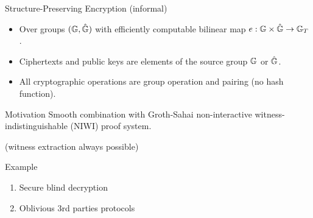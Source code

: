\begin{frame}
  \begin{block}{Structure-Preserving Encryption (informal)}
    \pause
    \begin{itemize}
    \item Over groups $(\mathbb{G}, \hat{\mathbb{G}})$ with efficiently computable bilinear map $e: \mathbb{G} \times \hat{\mathbb{G}} \to \mathbb{G}_T$.
      \pause
    \item Ciphertexts and public keys are elements of the source group $\mathbb{G}$ or $\hat{\mathbb{G}}$.
      \pause
    \item All cryptographic operations are group operation and pairing (\eg no hash function).
    \end{itemize}
  \end{block}

  \pause
  
  \begin{block}{Motivation}
    Smooth combination with Groth-Sahai non-interactive witness-indistinguishable (NIWI) proof system.

    (witness extraction always possible)
  \end{block}

  \pause
  
  \begin{block}{Example}

    \begin{enumerate}
    \item Secure blind decryption~\cite{DBLP:conf/pkc/Green11}
    \item Oblivious 3rd parties protocols~\cite{DBLP:conf/dim/CamenischGH08}
    \end{enumerate}
  \end{block}
\end{frame}



